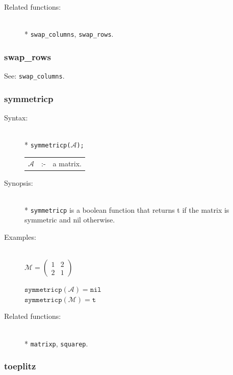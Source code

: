 {\begin{description}
\item[Related functions:]\mbox{}\\*
\texttt{swap\_columns}, \texttt{swap\_rows}.
\end{description}


\subsubsection{swap\_rows}
\label{linalg:swap_rows}
\hypertarget{operator:SWAP_ROWS}{}
See: \texttt{swap\_columns}.


\subsubsection{symmetricp}
\label{linalg:symmetricp}
\hypertarget{operator:SYMMETRICP}{}

\begin{description}
\item[Syntax:]\mbox{}\\*
{\tt symmetricp($\mathcal{A}$);}\\[2mm]
\begin{tabular}{l l l}
$\mathcal{A}$ &:-& a matrix.
\end{tabular}

\item[Synopsis:]\mbox{}\\*
\texttt{symmetricp} is a boolean function that returns t if the
                matrix is symmetric and nil otherwise.

\item[Examples:]\mbox{}\\
  \(\mathcal{M} = \begin{pmatrix} 1 & 2 \\ 2 & 1 \end{pmatrix}\)

  \(\texttt{symmetricp}(\mathcal{A}) = \texttt{nil}\)\\
  \(\texttt{symmetricp}(\mathcal{M}) = \texttt{t}\)

\item[Related functions:]\mbox{}\\*
\texttt{matrixp}, \texttt{squarep}.
\end{description}


\subsubsection{toeplitz}
\label{linalg:toeplitz}
\hypertarget{operator:TOEPLITZ}{}

}

